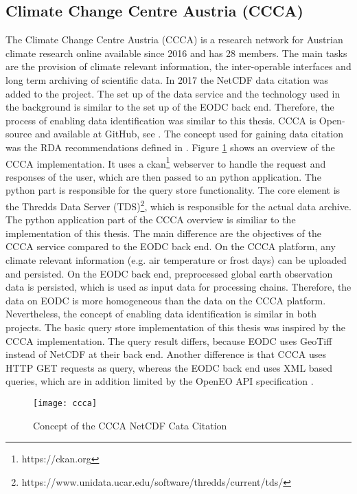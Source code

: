 \documentclass[draft,final]{vutinfth} %
\begin{document}
\subsection{Climate Change Centre Austria (CCCA)}

The Climate Change Centre Austria (CCCA) is a research network for Austrian climate research online available since 2016 and has 28 members. The main tasks are the provision of climate relevant information, the inter-operable interfaces and long term archiving of scientific data. In 2017 the NetCDF data citation was added to the project. The set up of the data service and the technology used in the background is similar to the set up of the EODC back end. Therefore, the process of enabling data identification was similar to this thesis. CCCA is Open-source and available at GitHub, see \cite{ccca_github}. The concept used for gaining data citation was the RDA recommendations defined in \cite{rauber2016identification}. Figure \ref{fig:ccca} shows an overview of the CCCA implementation. It uses a ckan\footnote{https://ckan.org} webserver to handle the request and responses of the user, which are then passed to an python application. The python part is responsible for the query store functionality. The core element is the Thredds Data Server (TDS)\footnote{https://www.unidata.ucar.edu/software/thredds/current/tds/}, which is responsible for the actual data archive.   
The python application part of the CCCA overview is similiar to the implementation of this thesis. The main difference are the objectives of the CCCA service compared to the EODC back end. On the CCCA platform, any climate relevant information (e.g. air temperature or frost days) can be uploaded and persisted. On the EODC back end, preprocessed global earth observation data is persisted, which is used as input data for processing chains. Therefore, the data on EODC is more homogeneous than the data on the CCCA platform. Nevertheless, the concept of enabling data identification is similar in both projects. The basic query store implementation of this thesis was inspired by the CCCA implementation. The query result differs, because EODC uses GeoTiff instead of NetCDF at their back end. Another difference is that CCCA uses HTTP GET requests as query, whereas the EODC back end uses XML based queries, which are in addition limited by the OpenEO API specification \cite{ccca}.  

\begin{figure}[h]
	\centering
	\texttt{[image: ccca]}
	\caption{Concept of the CCCA NetCDF Cata Citation \cite{ccca}}
	\label{fig:ccca} %
\end{figure}
\end{document}
